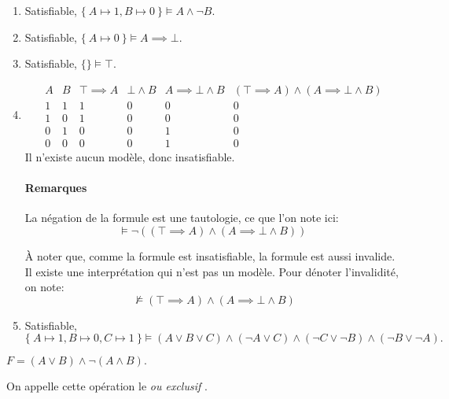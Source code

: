 \documentclass[12pt,french,a4paper]{article}
\begin{document}
\begin{question}
\begin{enumerate}

\item Satisfiable, $\{\ A \mapsto 1, B \mapsto 0\ \} \vDash A \wedge \neg B.$
\item Satisfiable, $\{\ A \mapsto 0\ \} \vDash A \implies \bot.$
\item Satisfiable, $\{ \} \vDash \top.$

\item\begin{displaymath}
\begin{array}{cc|cccc}
A & B & \top \implies A & \bot \wedge B &  A \implies \bot \wedge B &  (\top \implies A) \wedge( A \implies \bot \wedge B) \\
\hline
1 & 1 & 1 & 0 & 0 & 0\\
1 & 0 & 1 & 0 & 0 & 0\\
0 & 1 & 0 & 0 & 1 & 0\\
0 & 0 & 0 & 0 & 1 & 0
\end{array}
\end{displaymath}
Il n'existe aucun modèle, donc insatisfiable.

\paragraph{Remarques}
La négation de la formule est une tautologie, ce que l'on note ici:
\[
\vDash \neg ((\top \implies A) \wedge( A \implies \bot \wedge B))\
\]

À noter que, comme la formule est insatisfiable, la formule est aussi invalide. Il existe une interprétation qui n'est pas un modèle. Pour dénoter l'invalidité, on note:
\[\not \vDash (\top \implies A) \wedge( A \implies \bot \wedge B)\]

\item Satisfiable, $\{\ A \mapsto 1, B \mapsto 0, C \mapsto 1\ \} \vDash (A \vee B \vee C) \wedge (\neg A \vee C) \wedge (\neg C \vee \neg B) \wedge (\neg B \vee \neg A).$

\end{enumerate}
\end{question}


\begin{question}
$F = (A \vee B) \wedge \neg (A \wedge B).$

On appelle cette opération le \og \textit{ou exclusif} \fg{}.
\end{question}
\end{document}
